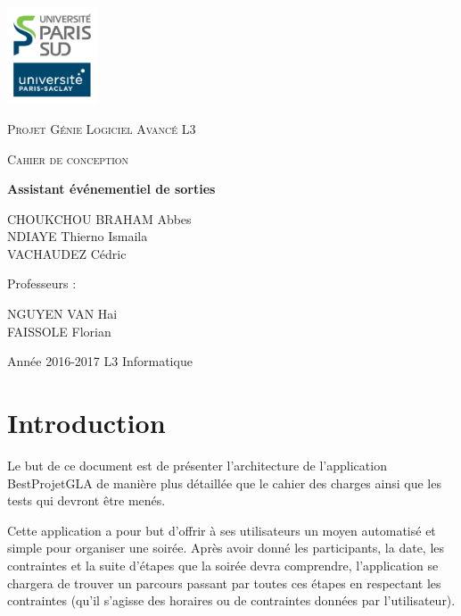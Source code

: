 \documentclass[a4paper, 12pt, notitlepage]{article} %
\begin{document}
\begin{titlepage}
	\centering
	\includegraphics[width=0.2\textwidth]{LogoUPSUD_ParisSaclay.jpg}\par\vspace{1cm}
	{\scshape\large Projet Génie Logiciel Avancé L3 \par}
	\vspace{1cm}
	{\scshape\LARGE Cahier de conception\par}
	\vspace{1cm}
	{\huge\bfseries Assistant événementiel de sorties\par}
	\vspace{2cm}
	{\large CHOUKCHOU BRAHAM Abbes \\
					NDIAYE Thierno Ismaila\\
					VACHAUDEZ Cédric\par}
	\vfill
	Professeurs :\par NGUYEN VAN Hai\\FAISSOLE Florian
	\vfill
	{\large Année 2016-2017 L3 Informatique\par\par}
\end{titlepage}

{
\setlength{\parskip}{0 ex}
\tableofcontents
\thispagestyle{empty}
\newpage

\listoffigures
\thispagestyle{empty}
}
\newpage
{}


\section{Introduction}
Le but de ce document est de présenter l'architecture de l'application BestProjetGLA de manière plus détaillée que le cahier des charges ainsi que les tests qui devront être menés.

Cette application a pour but d'offrir à ses utilisateurs un moyen automatisé et simple pour organiser une soirée. Après avoir donné les participants, la date, les contraintes et la suite d'étapes que la soirée devra comprendre, l'application se chargera de trouver un parcours passant par toutes ces étapes en respectant les contraintes (qu'il s’agisse des horaires ou de contraintes données par l'utilisateur).
\end{document}
